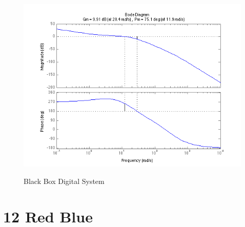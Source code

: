\documentclass[english]{article}
\begin{document}
\begin{figure}[h!]
\caption{Black Box Digital System } 
\includegraphics[width = \linewidth]{4c_digital.png}
\label{fig:4_b2}
\end{figure}
\FloatBarrier

\section*{12 Red Blue}
\end{document}
